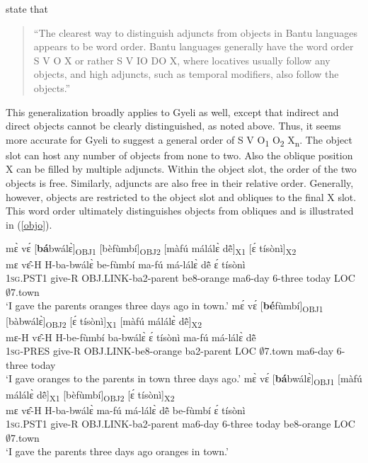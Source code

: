 \citet[279]{riedel2012} state that \begin{quote}
``The clearest way to distinguish adjuncts from objects in Bantu languages appears to be word order. Bantu languages generally have the word order S V O X or rather S V IO DO X, where locatives usually follow any objects, and high adjuncts, such as temporal modifiers, also follow the objects.'' \end{quote}

\noindent This generalization broadly applies to Gyeli as well, except that indirect and direct objects cannot be clearly distinguished, as noted above. Thus, it seems more accurate for Gyeli to suggest a general order of S V O\textsubscript{1} O\textsubscript{2} X\textsubscript{n}. The object slot can host any number of objects from none to two. Also the oblique position X can be filled by multiple adjuncts. Within the object slot, the order of the two objects is free. Similarly,  adjuncts are also  free in their relative order. Generally, however, objects are restricted to the object slot and obliques to the final X slot. This word order ultimately distinguishes objects from obliques and is illustrated in (\ref{objo}). 

\begin{exe}
\ex\label{objo}
\begin{xlist}
\ex\label{objo1}
  \glll  mɛ̀ vɛ́ [{\bfseries bá}bwálɛ̀]\textsubscript{OBJ1} [bèfùmbí]\textsubscript{OBJ2} [màfú málálɛ̀ dẽ̂]\textsubscript{X1} [ɛ́ tísònì]\textsubscript{X2}  \\
        mɛ vɛ̂-H H-ba-bwálɛ̀ be-fùmbí ma-fú má-lálɛ̀ dẽ̂ ɛ́ tísònì\\
           1\textsc{sg}.PST1 give-R OBJ.LINK-ba2-parent be8-orange ma6-day 6-three today LOC $\emptyset$7.town  \\
    \trans `I gave the parents oranges three days ago in town.'
\ex \label{objo2}
  \glll  mɛ́ vɛ́ [{\bfseries bé}fùmbí]\textsubscript{OBJ1} [bàbwálɛ̀]\textsubscript{OBJ2} [ɛ́ tísònì]\textsubscript{X1} [màfú málálɛ̀ dẽ̂]\textsubscript{X2}  \\
       mɛ-H vɛ̂-H H-be-fùmbí ba-bwálɛ̀ ɛ́ tísònì ma-fú má-lálɛ̀ dẽ̂ \\
         1\textsc{sg}-PRES give-R OBJ.LINK-be8-orange ba2-parent LOC $\emptyset$7.town ma6-day 6-three today \\
    \trans `I gave oranges to the parents in town three days ago.'
\ex\label{objo3}
  \glll  *mɛ̀ vɛ́ [{\bfseries bá}bwálɛ̀]\textsubscript{OBJ1}  [màfú málálɛ̀ dẽ̂]\textsubscript{X1} [bèfùmbí]\textsubscript{OBJ2} [ɛ́ tísònì]\textsubscript{X2} \\
        mɛ vɛ̂-H H-ba-bwálɛ̀ ma-fú má-lálɛ̀ dẽ̂ be-fùmbí ɛ́ tísònì \\
           1\textsc{sg}.PST1 give-R OBJ.LINK-ba2-parent ma6-day 6-three today be8-orange LOC $\emptyset$7.town \\
    \trans `I gave the parents three days ago oranges in town.'
\end{xlist}
\end{exe} 

